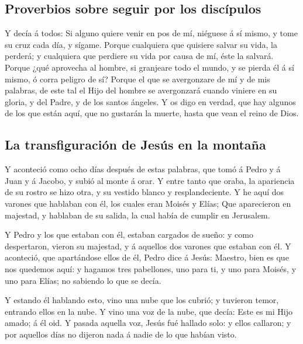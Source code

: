 \hypertarget{proverbios-sobre-seguir-por-los-discuxedpulos}{%
\subsection{Proverbios sobre seguir por los
discípulos}\label{proverbios-sobre-seguir-por-los-discuxedpulos}}

 Y decía á todos: Si alguno quiere venir en pos de mí,
niéguese á sí mismo, y tome su cruz cada día, y sígame. 
Porque cualquiera que quisiere salvar su vida, la perderá; y cualquiera
que perdiere su vida por causa de mí, éste la salvará. 
Porque ¿qué aprovecha al hombre, si granjeare todo el mundo, y se pierda
él á sí mismo, ó corra peligro de sí?  Porque el que se
avergonzare de mí y de mis palabras, de este tal el Hijo del hombre se
avergonzará cuando viniere en su gloria, y del Padre, y de los santos
ángeles.  Y os digo en verdad, que hay algunos de los que
están aquí, que no gustarán la muerte, hasta que vean el reino de Dios.

\hypertarget{la-transfiguraciuxf3n-de-jesuxfas-en-la-montauxf1a}{%
\subsection{La transfiguración de Jesús en la
montaña}\label{la-transfiguraciuxf3n-de-jesuxfas-en-la-montauxf1a}}

 Y aconteció como ocho días después de estas palabras,
que tomó á Pedro y á Juan y á Jacobo, y subió al monte á orar.
 Y entre tanto que oraba, la apariencia de su rostro se
hizo otra, y su vestido blanco y resplandeciente.  Y he
aquí dos varones que hablaban con él, los cuales eran Moisés y Elías;
 Que aparecieron en majestad, y hablaban de su salida, la
cual había de cumplir en Jerusalem.

 Y Pedro y los que estaban con él, estaban cargados de
sueño: y como despertaron, vieron su majestad, y á aquellos dos varones
que estaban con él.  Y aconteció, que apartándose ellos
de él, Pedro dice á Jesús: Maestro, bien es que nos quedemos aquí: y
hagamos tres pabellones, uno para ti, y uno para Moisés, y uno para
Elías; no sabiendo lo que se decía.

 Y estando él hablando esto, vino una nube que los
cubrió; y tuvieron temor, entrando ellos en la nube.  Y
vino una voz de la nube, que decía: Este es mi Hijo amado; á él oid.
 Y pasada aquella voz, Jesús fué hallado solo: y ellos
callaron; y por aquellos días no dijeron nada á nadie de lo que habían
visto.

